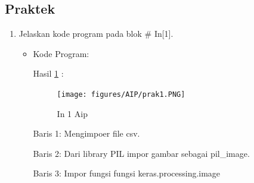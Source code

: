 \par
\par
\subsection{Praktek}
\begin{enumerate}
\item Jelaskan kode program pada blok \# In[1].
\begin{itemize}
\item Kode Program:

\par Hasil \ref{in1aip} :
\begin{figure}[!hbtp]
\centering
\texttt{[image: figures/AIP/prak1.PNG]}
\caption{In 1 Aip}
\label{in1aip}
\end{figure}
\par Baris 1: Mengimpoer file csv.
\par Baris 2: Dari library PIL impor gambar sebagai pil\_image.
\par Baris 3: Impor fungsi fungsi keras.processing.image
\end{itemize}
\par


\end{enumerate}
